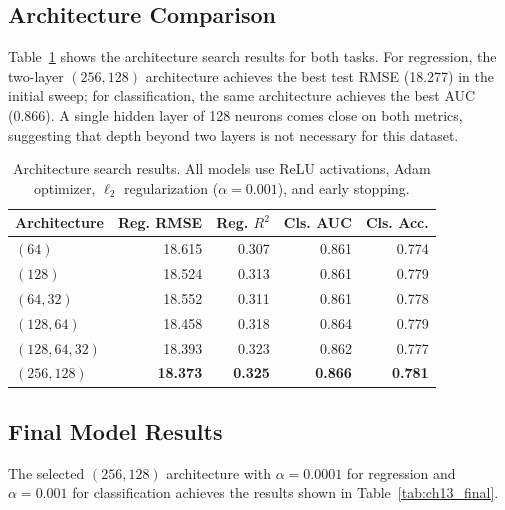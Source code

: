 \documentclass[12pt, oneside]{book}
\begin{document}
\subsection{Architecture Comparison}
 
Table~\ref{tab:ch13_arch} shows the architecture search results for both tasks. For regression, the two-layer $(256, 128)$ architecture achieves the best test RMSE (18.277) in the initial sweep; for classification, the same architecture achieves the best AUC (0.866). A single hidden layer of 128 neurons comes close on both metrics, suggesting that depth beyond two layers is not necessary for this dataset.
 
\begin{table}[H]
\centering
\caption{Architecture search results. All models use ReLU activations, Adam optimizer, $\ell_2$ regularization ($\alpha = 0.001$), and early stopping.}
\label{tab:ch13_arch}
\begin{tabular}{lrrrr}
\toprule
\textbf{Architecture} & \textbf{Reg. RMSE} & \textbf{Reg. $R^2$} & \textbf{Cls. AUC} & \textbf{Cls. Acc.} \\
\midrule
$(64)$           & 18.615 & 0.307 & 0.861 & 0.774 \\
$(128)$          & 18.524 & 0.313 & 0.861 & 0.779 \\
$(64, 32)$       & 18.552 & 0.311 & 0.861 & 0.778 \\
$(128, 64)$      & 18.458 & 0.318 & 0.864 & 0.779 \\
$(128, 64, 32)$  & 18.393 & 0.323 & 0.862 & 0.777 \\
\textbf{$(256, 128)$}  & \textbf{18.373} & \textbf{0.325} & \textbf{0.866} & \textbf{0.781} \\
\bottomrule
\end{tabular}
\end{table}
 
\subsection{Final Model Results}
 
The selected $(256, 128)$ architecture with $\alpha = 0.0001$ for regression and $\alpha = 0.001$ for classification achieves the results shown in Table~\ref{tab:ch13_final}.
 
\end{document}
